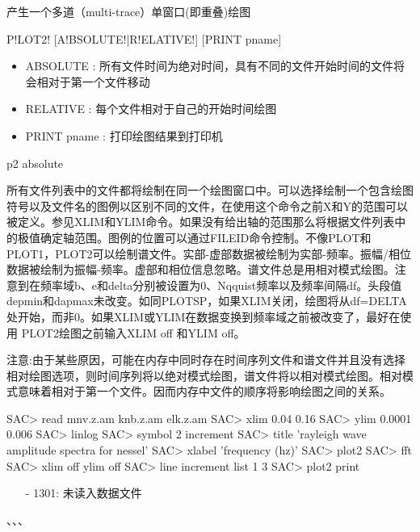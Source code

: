 \label{cmd:plot2}

产生一个多道（multi-trace）单窗口(即重叠)绘图

\begin{SACSTX}
P!LOT2! [A!BSOLUTE!|R!ELATIVE!] [PRINT pname]
\end{SACSTX}

\begin{itemize}
\item ABSOLUTE : 所有文件时间为绝对时间，具有不同的文件开始时间的文件将会相对于第一个文件移动 
\item RELATIVE : 每个文件相对于自己的开始时间绘图 
\item PRINT {pname} : 打印绘图结果到打印机 
\end{itemize}

\begin{SACDFT}
p2 absolute
\end{SACDFT}

所有文件列表中的文件都将绘制在同一个绘图窗口中。可以选择绘制一个包含绘图符号以及文件名的图例以区别不同的文件，在使用这个命令之前X和Y的范围可以被定义。参见XLIM和YLIM命令。如果没有给出轴的范围那么将根据文件列表中的极值确定轴范围。图例的位置可以通过FILEID命令控制。不像PLOT和PLOT1，PLOT2可以绘制谱文件。实部-虚部数据被绘制为实部-频率。振幅/相位数据被绘制为振幅-频率。虚部和相位信息忽略。谱文件总是用相对模式绘图。注意到在频率域b、e和delta分别被设置为0、Nqquist频率以及频率间隔df。头段值depmin和dapmax未改变。如同PLOTSP，如果XLIM关闭，绘图将从df=DELTA处开始，而非0。如果XLIM或YLIM在数据变换到频率域之前被改变了，最好在使用	PLOT2绘图之前输入XLIM off 和YLIM off。

注意:由于某些原因，可能在内存中同时存在时间序列文件和谱文件并且没有选择相对绘图选项，则时间序列将以绝对模式绘图，谱文件将以相对模式绘图。相对模式意味着相对于第一个文件。因而内存中文件的顺序将影响绘图之间的关系。

\begin{SACCode}
SAC> read mnv.z.am knb.z.am elk.z.am
SAC> xlim 0.04 0.16
SAC> ylim 0.0001 0.006
SAC> linlog
SAC> symbol 2 increment
SAC> title 'rayleigh wave amplitude spectra for nessel'
SAC> xlabel 'frequency (hz)'
SAC> plot2
SAC> fft
SAC> xlim off ylim off
SAC> line increment list 1 3
SAC> plot2 print
\end{SACCode}

\begin{itemize}
\item[-]1301: 未读入数据文件
\end{itemize}

、、、
